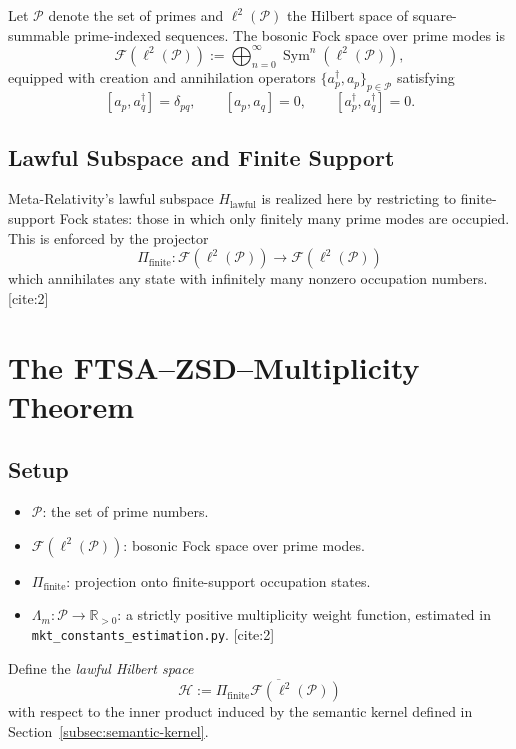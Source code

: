 \documentclass[11pt]{article}
\begin{document}
Let $\mathcal{P}$ denote the set of primes and $\ell^2(\mathcal{P})$
the Hilbert space of square-summable prime-indexed sequences.
The bosonic Fock space over prime modes is
\[
  \mathcal{F}(\ell^2(\mathcal{P}))
    := \bigoplus_{n=0}^{\infty} \operatorname{Sym}^n(\ell^2(\mathcal{P})),
\]
equipped with creation and annihilation operators
$\{a_p^\dagger, a_p\}_{p \in \mathcal{P}}$ satisfying
\[
  [a_p, a_q^\dagger] = \delta_{pq}, \qquad
  [a_p, a_q] = 0, \qquad
  [a_p^\dagger, a_q^\dagger] = 0.
\]

\subsection{Lawful Subspace and Finite Support}

Meta-Relativity's lawful subspace $H_{\text{lawful}}$ is realized here
by restricting to finite-support Fock states: those in which only
finitely many prime modes are occupied. This is enforced by the
projector
\[
  \Pi_{\text{finite}} : \mathcal{F}(\ell^2(\mathcal{P}))
    \to \mathcal{F}(\ell^2(\mathcal{P}))
\]
which annihilates any state with infinitely many nonzero occupation
numbers. [cite:2]

\section{The FTSA--ZSD--Multiplicity Theorem}

\subsection{Setup}

\begin{itemize}
\item $\mathcal{P}$: the set of prime numbers.
\item $\mathcal{F}(\ell^2(\mathcal{P}))$: bosonic Fock space over prime modes.
\item $\Pi_{\text{finite}}$: projection onto finite-support occupation states.
\item $\Lambda_m : \mathcal{P} \to \mathbb{R}_{>0}$: a strictly positive
      multiplicity weight function, estimated in
      \texttt{mkt\_constants\_estimation.py}. [cite:2]
\end{itemize}

Define the \emph{lawful Hilbert space}
\[
  \mathcal{H}
    := \overline{\Pi_{\text{finite}} \mathcal{F}(\ell^2(\mathcal{P}))}
\]
with respect to the inner product induced by the semantic kernel
defined in Section~\ref{subsec:semantic-kernel}.
\end{document}
